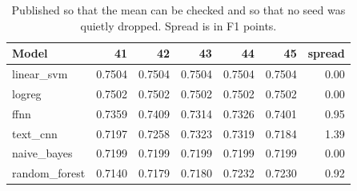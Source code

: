 \begin{table}[htbp]
\centering
\caption{Raw cross-repository F1 for every seed.}
\label{tab:seeds}
\begin{tabular}{lrrrrrr}
\toprule
Model & 41 & 42 & 43 & 44 & 45 & spread \\
\midrule
linear\_svm & 0.7504 & 0.7504 & 0.7504 & 0.7504 & 0.7504 & 0.00 \\
logreg & 0.7502 & 0.7502 & 0.7502 & 0.7502 & 0.7502 & 0.00 \\
ffnn & 0.7359 & 0.7409 & 0.7314 & 0.7326 & 0.7401 & 0.95 \\
text\_cnn & 0.7197 & 0.7258 & 0.7323 & 0.7319 & 0.7184 & 1.39 \\
naive\_bayes & 0.7199 & 0.7199 & 0.7199 & 0.7199 & 0.7199 & 0.00 \\
random\_forest & 0.7140 & 0.7179 & 0.7180 & 0.7232 & 0.7230 & 0.92 \\
\bottomrule
\end{tabular}
\caption*{\footnotesize Published so that the mean can be checked and so that no seed was quietly dropped. Spread is in F1 points.}
\end{table}

